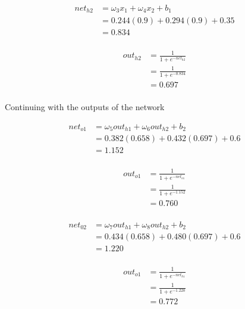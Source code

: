 \documentclass[10pt,a4paper]{article}
\begin{document}
\begin{equation}
\begin{split}
net_{h2} &= \omega_3 x_1 + \omega_4 x_2 + b_1 \\
         &= 0.244(0.9) + 0.294(0.9) + 0.35 \\
         &= 0.834\\
\end{split}
\end{equation}

\begin{equation}
\begin{split}
out_{h2} &= \frac{1}{1+e^{-net_{h2}}}\\ 
         &= \frac{1}{1+e^{-0.834}}\\ 
         &= 0.697\\
\end{split}
\end{equation}

Continuing with the outputs of the network

\begin{equation}
\begin{split}
net_{o1} &= \omega_5 out_{h1} + \omega_6 out_{h2} + b_2 \\
         &= 0.382(0.658) + 0.432(0.697) + 0.6 \\
         &= 1.152\\
\end{split}
\end{equation}

\begin{equation}
\begin{split}
out_{o1} &= \frac{1}{1+e^{-net_{o1}}}\\ 
         &= \frac{1}{1+e^{-1.152}}\\ 
         &= 0.760\\
\end{split}
\end{equation}

\begin{equation}
\begin{split}
net_{02} &= \omega_7 out_{h1} + \omega_8 out_{h2} + b_2 \\
         &= 0.434(0.658) + 0.480(0.697) + 0.6 \\
         &= 1.220\\
\end{split}
\end{equation}

\begin{equation}
\begin{split}
out_{o1} &= \frac{1}{1+e^{-net_{h1}}}\\ 
         &= \frac{1}{1+e^{-1.220}}\\ 
         &= 0.772\\
\end{split}
\end{equation}
\end{document}
